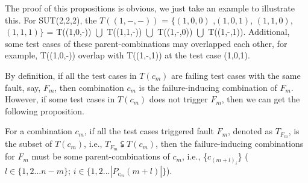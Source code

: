 \documentclass{sig-alternate}
\begin{document}
The proof of this propositions is obvious, we just take an example to illustrate this. For SUT(2,2,2), the $T((1,-,-))$ = $\{(1,0,0)$ ,$(1,0,1)$, $(1,1,0)$, $(1,1,1)\}$ =  T((1,0,-)) $\bigcup$ T((1,1,-)) $\bigcup$ T((1,-,0)) $\bigcup$ T((1,-,1)). Additional, some test cases of these parent-combinations may overlapped each other, for example, T((1,0,-)) overlap with T((1,-,1)) at the test case (1,0,1).

By definition, if all the test cases in $T(c_{m})$ are failing test cases with the same fault, say,  $F_{m}$, then combination $c_{m}$ is the failure-inducing combination of $F_{m}$. However, if some test cases in $T(c_{m})$ does not trigger $F_{m}$, then we can get the following proposition.

\begin{proposition}
For a combination $c_{m}$, if all the test cases triggered fault $F_{m}$, denoted as $T_{F_{m}}$, is the subset of $T(c_{m})$, i.e.,  $T_{F_{m}} \subsetneqq T(c_{m})$, then the failure-inducing combinations for $F_{m}$ must be some parent-combinations of $c_{m}$, i.e., \{$c_{(m+l)_{i}}$\} (  $l \in \{1, 2... n-m\}$;   $i \in \{1,2 ... |P_{c_{m}}(m+l)| \}$).

%

\end{proposition}
\end{document}
